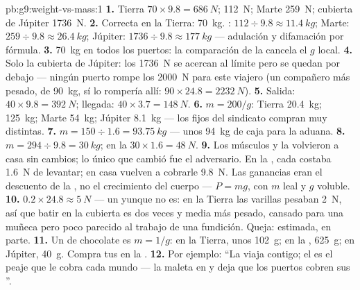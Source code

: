 \begin{solution}{pb:g9:weight-vs-mass:1}
\textbf{1.} Tierra $70 \times 9.8 = \qty{686}{N}$; 
\qty{112}{N}; Marte \qty{259}{N}; cubierta de Júpiter
\qty{1736}{N}.
\textbf{2.} Correcta en la Tierra: \qty{70}{kg}. : $112 \div
9.8 \approx \qty{11.4}{kg}$; Marte: $259 \div 9.8 \approx
\qty{26.4}{kg}$; Júpiter: $1736 \div 9.8 \approx \qty{177}{kg}$ ---
adulación y difamación por fórmula.
\textbf{3.} \qty{70}{kg} en todos los puertos: la comparación de la
 cancela el $g$ local.
\textbf{4.} Solo la cubierta de Júpiter: los \qty{1736}{N} se acercan
al límite pero se quedan por debajo --- ningún puerto rompe los
\qty{2000}{N} para este viajero (un compañero más pesado, de
\qty{90}{kg}, sí lo rompería allí: $90 \times 24.8 =
\qty{2232}{N}$).
\textbf{5.} Salida: $40 \times 9.8 = \qty{392}{N}$; llegada: $40
\times 3.7 = \qty{148}{N}$.
\textbf{6.} $m = 200/g$: Tierra \qty{20.4}{kg}; 
\qty{125}{kg}; Marte \qty{54}{kg}; Júpiter \qty{8.1}{kg} --- los
 fijos del sindicato compran  muy distintas.
\textbf{7.} $m = 150 \div 1.6 = \qty{93.75}{kg}$ --- unos
\qty{94}{kg} de caja para la aduana.
\textbf{8.} $m = 294 \div 9.8 = \qty{30}{kg}$;  en la
 $30 \times 1.6 = \qty{48}{N}$.
\textbf{9.} Los músculos y la  volvieron a casa sin cambios;
lo único que cambió fue el adversario. En la , cada
 costaba \qty{1.6}{N} de levantar; en casa vuelven a
cobrarle \qty{9.8}{N}. Las ganancias eran el descuento de la
, no el crecimiento del cuerpo --- $P = m g$, con $m$ leal y
$g$ voluble.
\textbf{10.} $0.2 \times 24.8 \approx \qty{5}{N}$ --- un yunque no es:
en la Tierra las varillas pesaban \qty{2}{N}, así que batir en la
cubierta es dos veces y media más pesado, cansado para una muñeca pero
poco parecido al trabajo de una fundición. Queja: estimada, en parte.
\textbf{11.} Un  de chocolate es $m = 1/g$: en la Tierra,
unos \qty{102}{g}; en la , \qty{625}{g}; en Júpiter,
\qty{40}{g}. Compra tus  en la .
\textbf{12.} Por ejemplo: ``La  viaja contigo; el
 es el peaje que le cobra cada mundo ---  la maleta en
 y deja que los puertos cobren sus
''.
\end{solution}
